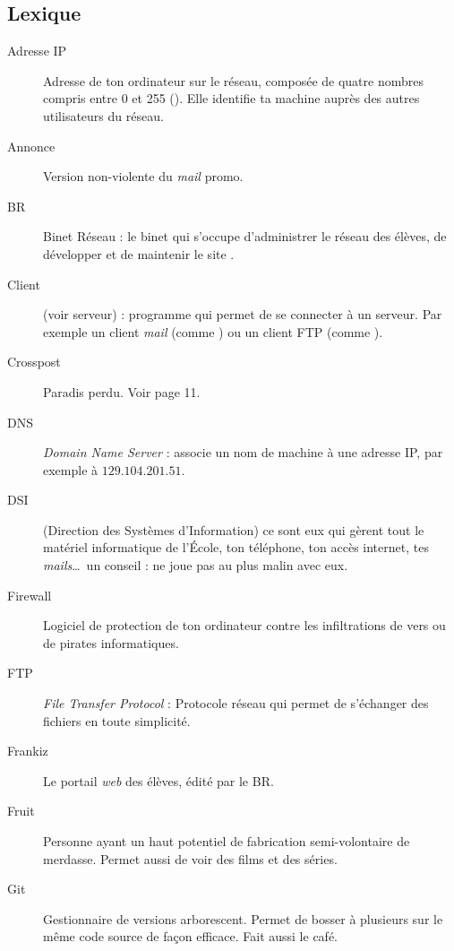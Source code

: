 \subsection{Lexique}


\begin{description}
  \item[Adresse IP] Adresse de ton ordinateur sur le r\'eseau, compos\'ee de quatre nombres compris entre 0 et 255  (). Elle identifie ta machine aupr\`es des autres utilisateurs du r\'eseau.
  \item[Annonce] Version non-violente du \emph{mail} promo.
  
  \item[BR] Binet R\'eseau : le binet qui s'occupe d'administrer le r\'eseau des \'el\`eves, de d\'evelopper et de maintenir le site .

  \item[Client] (voir serveur) : programme qui permet de se connecter \`a un serveur. Par exemple un client \emph{mail}
	(comme ) ou un client FTP (comme ).
  \item[Crosspost] Paradis perdu. Voir page 11.
  \item[DNS] \emph{Domain Name Server} : associe un nom de machine \`a une adresse IP, par exemple  \`a  $129.104.201.51$.
  \item[DSI] (Direction des Syst\`emes d'Information) ce sont eux qui g\`erent tout le mat\'eriel informatique de l'\'Ecole, ton t\'el\'ephone, ton acc\`es internet, tes \emph{mails}\ldots\ un conseil : ne joue pas au plus malin avec eux.

  \item[Firewall] Logiciel de protection de ton ordinateur contre les infiltrations de vers ou de pirates informatiques.
  \item[FTP] \emph{File Transfer Protocol} : Protocole r\'eseau qui permet de s'\'echanger des fichiers en toute simplicit\'e.

  \item[Frankiz] Le portail \emph{web} des \'el\`eves, \'edit\'e par le BR.
  \item[Fruit] Personne ayant un haut potentiel de fabrication semi-volontaire de merdasse. Permet aussi de voir des films et des s\'eries.

  \item[Git] Gestionnaire de versions arborescent. Permet de bosser \`a plusieurs sur le m\^eme code source de fa\c{c}on efficace. Fait aussi le caf\'e.
  

\end{description}
